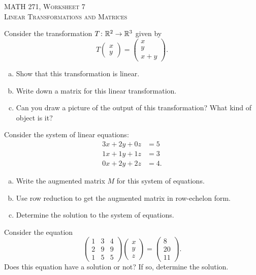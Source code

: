 \documentclass[12pt]{article} %
\begin{document}
\begin{center}
   \textsc{\large MATH 271, Worksheet 7}\\
   \textsc{Linear Transformations and Matrices}
\end{center}
\vspace{.5cm}

\begin{problem}
Consider the transformation $T\colon \mathbb{R}^2 \to \mathbb{R}^3$ given by
\[
T \begin{pmatrix} x \\ y \end{pmatrix} = \begin{pmatrix} x \\ y \\ x+y \end{pmatrix}.
\]
\begin{enumerate}[(a)]
    \item Show that this transformation is linear.
    \item Write down a matrix for this linear transformation.
    \item Can you draw a picture of the output of this transformation? What kind of object is it?
\end{enumerate}
\end{problem}

\begin{problem}
Consider the system of linear equations:
\begin{align*}
    3x+2y+0z&=5\\
    1x+1y+1z&=3\\
    0x+2y+2z&=4.
\end{align*}
\begin{enumerate}[(a)]
    \item Write the augmented matrix $M$ for this system of equations.
    \item Use row reduction to get the augmented matrix in row-echelon form.
    \item Determine the solution to the system of equations.
\end{enumerate}
\end{problem}

\begin{problem}
Consider the equation
\[
\begin{pmatrix} 1 & 3 & 4 \\ 2 & 9 & 9 \\ 1 & 5 & 5 \end{pmatrix} \begin{pmatrix} x \\ y \\ z \end{pmatrix} = \begin{pmatrix} 8 \\ 20 \\ 11 \end{pmatrix}.
\]
Does this equation have a solution or not? If so, determine the solution.
\end{problem}
\end{document}
